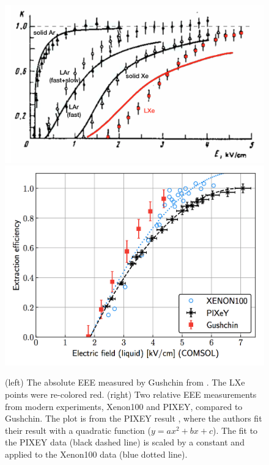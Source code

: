 \begin{figure}[htbp]
\begin{center}
\includegraphics[width=\halffig]{figures/etrains/gushchin_eee.png}
\includegraphics[width=\halffig]{figures/etrains/modern_eee.png}
\caption{(left) The absolute \ac{EEE} measured by Gushchin from \cite{Gushchin1982}. The \ac{LXe} points were re-colored red. (right) Two relative \ac{EEE} measurements from modern experiments, Xenon100 and PIXEY, compared to Gushchin. The plot is from the PIXEY result \cite{Edwards2018}, where the authors fit their result with a quadratic function ($y=ax^{2} + bx + c$). The fit to the PIXEY data (black dashed line) is scaled by a constant and applied to the Xenon100 data (blue dotted line). }
\label{fig:eee}
\end{center}
\end{figure}

